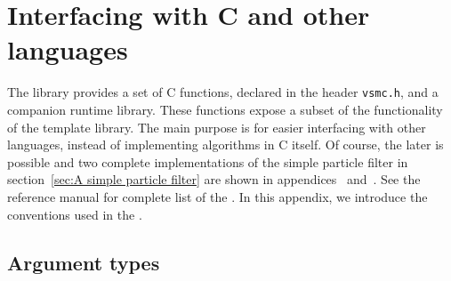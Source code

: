 \chapter{Interfacing with C and other languages}
\label{app:chap:Interfacing with C and other languages}

The library provides a set of C functions, declared in the header
\verb|vsmc.h|, and a companion runtime library. These functions expose a subset
of the functionality of the \cpp template library. The main purpose is for
easier interfacing with other languages, instead of implementing algorithms in
C itself. Of course, the later is possible and two complete \cnn
implementations of the simple particle filter in section~\ref{sec:A simple
  particle filter} are shown in appendices~ and~. See the reference manual for complete list of the \api. In this
appendix, we introduce the conventions used in the \api.

\section{Argument types}
\label{sec:Argument types}


